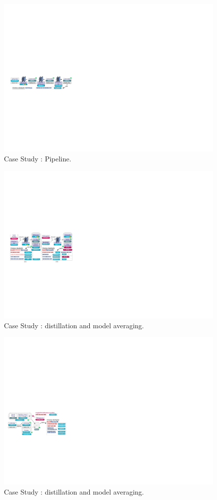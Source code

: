 \begin{figure}[t]
    \centering
    \includegraphics[width=\linewidth]{fig/case3.pdf}
    \caption{Case Study : Pipeline.}
    \Description{}
    \label{fig:case3}
\end{figure}


\begin{figure}[t]
    \centering
    \includegraphics[width=\linewidth]{fig/case4.pdf}
    \caption{Case Study : distillation and model averaging.}
    \Description{}
    \label{fig:case4}
\end{figure}

\begin{figure}[t]
    \centering
    \includegraphics[width=\linewidth]{fig/case5.pdf}
    \caption{Case Study : distillation and model averaging.}
    \Description{}
    \label{fig:case5}
\end{figure}